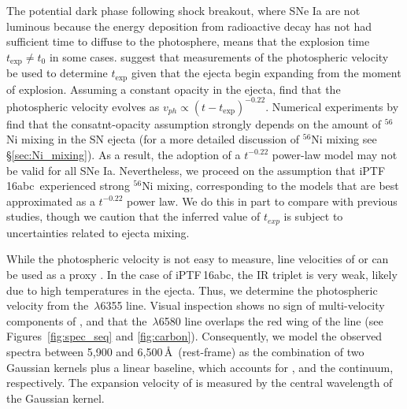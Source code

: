 \documentclass[twocolumn]{aastex61}
\newcommand{\abc}{iPTF\,16abc}
\begin{document}
The potential dark phase following shock breakout, where SNe Ia are not luminous because the energy deposition from radioactive decay has not had sufficient time to diffuse to the photosphere, means that the explosion time $t_\mathrm{exp} \ne t_0$ in some cases. \citet{2014ApJ...784...85P} suggest that measurements of the photospheric velocity be used to determine $t_\mathrm{exp}$ given that the ejecta begin expanding from the moment of explosion.  Assuming a constant opacity in the ejecta, \citeauthor{2014ApJ...784...85P} 
find that the photospheric velocity evolves as
$v_{ph}\propto(t-t_\mathrm{exp})^{-0.22}$. Numerical experiments by \citet{2016ApJ...826...96P} find that the consatnt-opacity assumption strongly depends on the amount of $^{56}$Ni mixing in the SN ejecta (for a more detailed discussion of $^{56}$Ni mixing see \S\ref{sec:Ni_mixing}). As a result, the adoption of a $t^{-0.22}$ power-law model may not be valid for all SNe Ia. Nevertheless, we proceed on the assumption that \abc\ experienced strong $^{56}$Ni mixing, corresponding to the models that are best approximated as a $t^{-0.22}$ power law. We do this in part to compare with previous studies, though we caution that the inferred value of $t_{exp}$ is subject to uncertainties related to ejecta mixing. 

While the photospheric velocity
is not easy to measure, line velocities of  or 
can be used as a proxy
\citep{2014ApJ...784...85P,2016ApJ...826..144S}. In the case of \abc, the  IR triplet is very weak, 
likely due to high temperatures in the ejecta. Thus, we
determine the photospheric velocity from the 
\,$\lambda$6355 line. Visual inspection shows no 
sign of multi-velocity components of , and that 
the \,$\lambda$6580 line overlaps the red
wing of the  line (see Figures~\ref{fig:spec_seq} and \ref{fig:carbon}). Consequently, we model the observed 
spectra between 5,900 and 6,500\,\AA\ (rest-frame) as the combination 
of two Gaussian kernels plus a linear baseline, which
accounts for ,  and the
continuum, respectively. The expansion
velocity of  is measured by the central wavelength
of the  Gaussian kernel.
\end{document}
